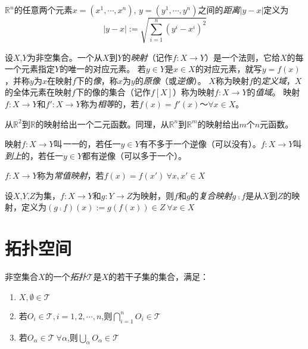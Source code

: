 \begin{definition}
$\mathbb{R}^n$的任意两个元素$x = (x^1, \cdots, x^n)$, $y = (y^1, \cdots, y^n)$之间的\emph{距离}$|y - x|$定义为
$$|y - x| := \sqrt{\sum^n_{i = 1}(y^i - x^i)^2}$$
\end{definition}

\begin{definition}
设$X$,$Y$为非空集合。一个从$X$到$Y$的\emph{映射}（记作$f \colon X \to Y$）是一个法则，它给$X$的每一个元素指定$Y$的唯一的对应元素。
若$y \in Y$是$x \in X$的对应元素，就写$y = f(x)$，并称$y$为$x$在映射$f$下的\emph{像}，称$x$为$y$的\emph{原像}（或\emph{逆像}）。
$X$称为映射$f$的\emph{定义域}，$X$的全体元素在映射$f$下的像的集合（记作$f[X]$）称为映射$f \colon X \to Y$的\emph{值域}。
映射$f \colon X \to Y$和$f' \colon X \to Y$称为\emph{相等}的，若$f(x) = f'(x) ～ \forall x \in X$。
\end{definition}

\begin{note}
从$\mathbb{R}^2$到$\mathbb{R}$的映射给出一个二元函数。同理，从$\mathbb{R}^n$到$\mathbb{R}^m$的映射给出$m$个$n$元函数。
\end{note}

\begin{definition}
映射$f \colon X \to Y$叫\emph{一一}的，若任一$y \in Y$有不多于一个逆像（可以没有）。$f \colon X \to Y$叫\emph{到上}的，若任一$y \in Y$都有逆像（可以多于一个）。
\end{definition}

\begin{definition}
$f \colon X \to Y$称为\emph{常值映射}，若$f(x) = f(x') ~ \forall x, x' \in X$
\end{definition}

\begin{definition}
设$X$,$Y$,$Z$为集，$f \colon X \to Y$和$g \colon Y \to Z$为映射，则$f$和$g$的\emph{复合映射}$g \comp f$是从$X$到$Z$的映射，定义为$(g \comp f)(x) := g(f(x)) \in Z ~ \forall x \in X$
\end{definition}

\section{拓扑空间}

\begin{definition}
非空集合$X$的一个\emph{拓扑}$\mathscr{T}$是$X$的若干子集的集合，满足：
\begin{enumerate}[（a）]
\item $X,\emptyset \in \mathscr{T}$
\item 若$O_i \in \mathscr{T}, i = 1, 2, \cdots, n$,则$\bigcap\limits^n_{i = 1}O_i \in \mathscr{T}$
\item 若$O_\alpha \in \mathscr{T} ~ \forall \alpha$,则$\bigcup\limits_{\alpha}O_\alpha \in \mathscr{T}$
\end{enumerate}
\end{definition}

